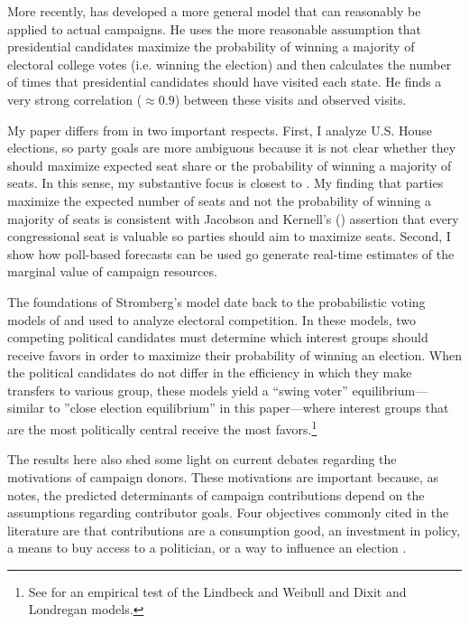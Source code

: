\documentclass[12pt,final,fleqn]{article}
\theoremstyle{plain}
\begin{document}
More recently, \citet{stromberg2008electoral} has developed a more general model that can reasonably be applied to actual campaigns. He uses the more reasonable assumption that presidential candidates maximize the probability of winning a majority of electoral college votes (i.e. winning the election) and then calculates the number of times that presidential candidates should have visited each state. He finds a very strong  correlation ($ \approx 0.9$) between these visits and observed visits. 

My paper differs from \citet*{stromberg2008electoral} in two important respects. First, I analyze U.S. House elections, so party goals are more ambiguous because it is not clear whether they should maximize expected seat share or the probability of winning a majority of seats. In this sense, my substantive focus is closest to \citet{snyder1989election}. My finding that parties maximize the expected number of seats and not the probability of winning a majority of seats is consistent with Jacobson and Kernell's (\citeyear{jacobson1985party}) assertion that every congressional seat is valuable so parties should aim to maximize seats. Second, I show how poll-based forecasts can be used go generate real-time estimates of the marginal value of campaign resources.

The foundations of Stromberg's model date back to the probabilistic voting models of \citet{lindbeck1987balanced} and \citet{dixit1996determinants} used to analyze electoral competition. In these models, two competing political candidates must determine which interest groups should receive favors in order to maximize their probability of winning an election. When the political candidates do not differ in the efficiency in which they make transfers to various group, these models yield a ``swing voter'' equilibrium---similar to ''close election equilibrium'' in this paper---where interest groups that are the most politically central receive the most favors.\footnote{See \citet{johansson2003intergovernmental} for an empirical test of the Lindbeck and Weibull and Dixit and Londregan models.}

The results here also shed some light on current debates regarding the motivations of campaign donors. These motivations are important because, as \citet{stratmann2005some} notes, the predicted determinants of campaign contributions depend on the assumptions regarding contributor goals. Four objectives commonly cited in the literature are that contributions are a consumption good, an investment in policy, a means to buy access to a politician, or a way to influence an election \citep[e.g.][]{ansolabehere2003there, stratmann2005some}. 
\end{document}
